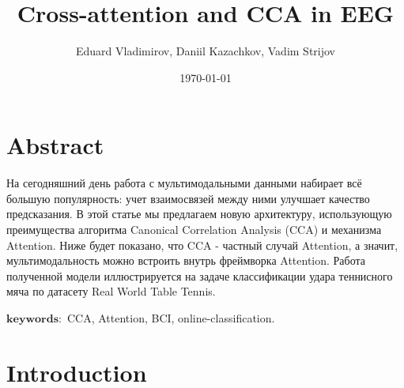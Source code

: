 \documentclass[a4paper,14pt]{article}
\author{Eduard Vladimirov, Daniil Kazachkov, Vadim Strijov}
\title{\textbf{Cross-attention and CCA in EEG}}
\date{\today}
\theoremstyle{plain} %
\theoremstyle{definition} %
\theoremstyle{remark} %
\begin{document}
	\maketitle
	
	\section{Abstract}
        На сегодняшний день работа с мультимодальными данными набирает всё большую популярность: учет взаимосвязей между ними улучшает качество предсказания. В этой статье мы предлагаем новую архитектуру, использующую преимущества алгоритма Canonical Correlation Analysis (CCA) и механизма Attention. Ниже будет показано, что CCA - частный случай Attention, а значит, мультимодальность можно встроить внутрь фреймворка Attention. Работа полученной модели иллюстрируется на задаче классификации удара теннисного мяча по датасету Real World Table Tennis. 

        $\mathbf{keywords:}$ CCA, Attention, BCI, online-classification.

        \section{Introduction}
\end{document}
